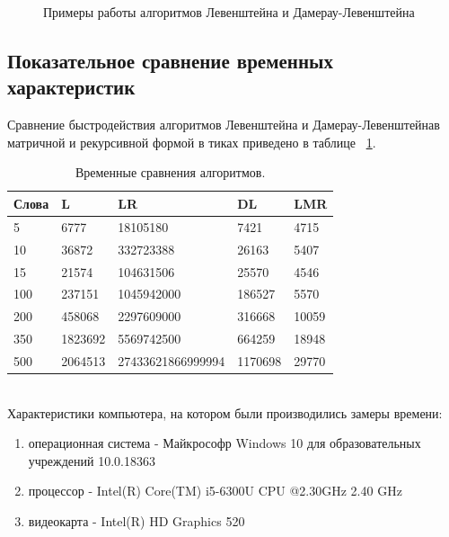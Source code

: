 \documentclass[a4paper]{article}
\begin{document}
	\begin{figure}[h]
	
	\caption{Примеры работы алгоритмов Левенштейна и Дамерау-Левенштейна\centering}
	\label{image8}
	\end{figure}

	\clearpage
	\subsection{Показательное сравнение временных характеристик}
	Сравнение быстродействия алгоритмов Левенштейна и Дамерау-Левенштейнав матричной и рекурсивной формой в тиках приведено в таблице ~\ref{tab:vremya1}. 
	\begin{table}[h]
		\caption{\label{tab:vremya1} Временные сравнения алгоритмов.}
			\begin{center}
				\begin{tabular}{|p{70pt}|p{100pt}|p{130pt}|p{90pt}|p{70pt}|}
					\hline
					Слова & L & LR & DL & LMR\\ \hline
					5 &  6777 &18105180  & 7421 & 4715\\	\hline
					10 & 36872 &332723388 & 26163 & 5407\\ \hline
					15 & 21574 &104631506 & 25570 & 4546\\ \hline
					100 &237151 & 1045942000 & 186527 & 5570 \\ \hline
					200 &458068 & 2297609000 & 316668 & 10059 \\ \hline
					350 &1823692& 5569742500 & 664259 & 18948 \\ \hline
					500 &2064513 & 27433621866999994 & 1170698 & 29770 \\ \hline
				\end{tabular}
			\end{center}
	\end{table}\\
	Характеристики компьютера, на котором были производились замеры времени:
	\begin{enumerate}
		\item операционная система - Майкрософр Windows 10 для образовательных учреждений 10.0.18363
		\item процессор - Intel(R) Core(TM) i5-6300U CPU @2.30GHz 2.40 GHz
		\item видеокарта - Intel(R) HD Graphics 520
	\end{enumerate}
	\clearpage
\end{document}
